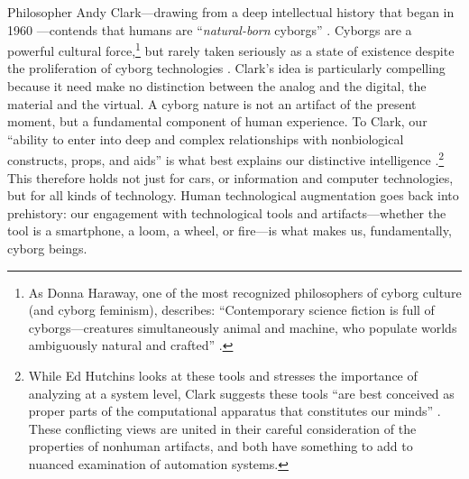 Philosopher Andy
Clark---drawing from a deep intellectual history that began in 1960 \cite{clyneskline}---contends that humans are ``\emph{natural-born}
cyborgs'' \cite[p. 6]{clarkNBC}. Cyborgs are a powerful cultural
force,\footnote{As Donna Haraway, one of the most recognized
philosophers of cyborg culture (and cyborg feminism), describes:
``Contemporary science 
fiction is full of cyborgs---creatures simultaneously
animal and machine, who populate worlds ambiguously natural and
crafted'' \cite[p. 117]{haraway}.} but rarely taken seriously as a state
of existence despite the proliferation of cyborg technologies \cite[p.
  65]{ekbia}. Clark's idea is particularly compelling
because it need make no distinction between the analog and the
digital, the material and the virtual. A cyborg nature is not an artifact of the
present moment, but a fundamental component of human experience. To
Clark, our ``ability to enter into deep and complex relationships with
nonbiological constructs, props, and aids'' is what best explains our
distinctive intelligence \cite[p. 5]{clarkNBC}.\footnote{While Ed
  Hutchins looks at these tools and stresses the importance of
  analyzing at a system level, Clark suggests these tools ``are best
  conceived as proper parts of the computational apparatus that
  constitutes our minds'' \cite[p. 6]{clarkNBC}. These conflicting views are
  united in their careful consideration of the properties of nonhuman artifacts,
  and both have something to add to nuanced examination of automation
  systems.} This therefore holds 
not just for cars, or information and computer technologies, but for
all kinds of technology. Human technological augmentation goes back into
prehistory: our engagement with technological tools and
artifacts---whether the tool is a smartphone, a loom, a wheel, or
fire---is what makes us, fundamentally, cyborg beings.


